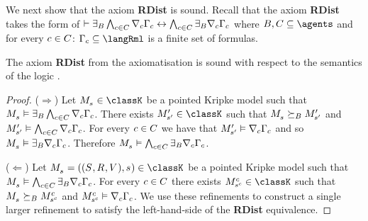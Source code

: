 We next show that the axiom {\bf RDist} is sound.
Recall that the axiom {\bf RDist} takes the form of $\proves \somerefsBs \bigwedge_{\agentC \in \agentsC} \coversC \Gamma_\agentC \iff \bigwedge_{\agentC \in \agentsC} \somerefsBs \coversC \Gamma_\agentC$ where $\agentsB, \agentsC \subseteq \agents$ and for every $\agentC \in \agentsC$: $\Gamma_\agentC \subseteq \langRml$ is a finite set of formulas.

\begin{lemma}\label{rml-k-rdist}
The axiom {\bf RDist} from the axiomatisation \axiomRmlK{} is sound with respect to the semantics of the logic \logicRmlK{}.
\end{lemma}

\begin{proof}
($\Rightarrow$) Let $\kPModel{\kStateS} \in \classK$ be a pointed Kripke model such that $\kPModel{\kStateS} \entails \somerefsBs \bigwedge_{\agentC \in \agentsC} \coversC \Gamma_\agentC$.
There exists $\kPModelP{\kStateSP} \in \classK$ such that $\kPModel{\kStateS} \simulatesBs \kPModelP{\kStateSP}$ and $\kPModelP{\kStateSP} \entails \bigwedge_{\agentC \in \agentsC} \coversC \Gamma_\agentC$.
For every $\agentC \in \agentsC$ we have that $\kPModelP{\kStateSP} \entails \coversC \Gamma_\agentC$ and so $\kPModel{\kStateS} \entails \somerefsBs \coversC \Gamma_\agentC$.
Therefore $\kPModel{\kStateS} \entails \bigwedge_{\agentC \in \agentsC} \somerefsBs \coversC \Gamma_\agentC$.

($\Leftarrow$) Let $\kPModelAndTuple{\kStateS} \in \classK$ be a pointed Kripke model such that $\kPModel{\kStateS} \entails \bigwedge_{\agentC \in \agentsC} \somerefsBs \coversC \Gamma_\agentC$.
For every $\agentC \in \agentsC$ there exists $\kPModel[\agentC]{\kStateS[\agentC]} \in \classK$ such that $\kPModel{\kStateS} \simulatesBs \kPModel[\agentC]{\kStateS[\agentC]}$ and $\kPModel[\agentC]{\kStateS[\agentC]} \entails \coversC \Gamma_\agentC$.
We use these refinements to construct a single larger refinement to satisfy the left-hand-side of the {\bf RDist} equivalence.


\end{proof}
